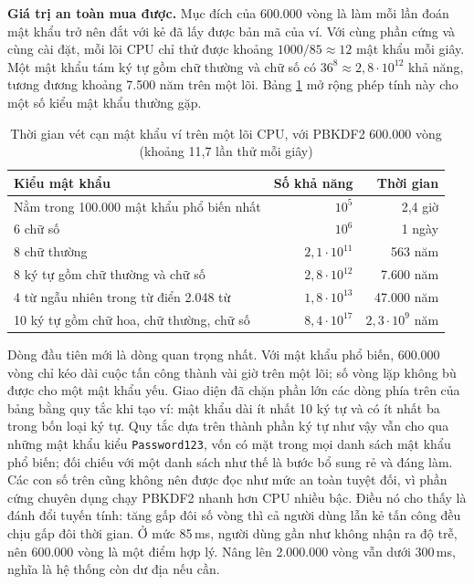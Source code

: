 \textbf{Giá trị an toàn mua được.} Mục đích của 600.000 vòng là làm mỗi lần đoán mật khẩu trở nên đắt với kẻ đã lấy được bản mã của ví. Với cùng phần cứng và cùng cài đặt, mỗi lõi CPU chỉ thử được khoảng $1000/85 \approx 12$ mật khẩu mỗi giây. Một mật khẩu tám ký tự gồm chữ thường và chữ số có $36^8 \approx 2{,}8 \cdot 10^{12}$ khả năng, tương đương khoảng 7.500 năm trên một lõi. Bảng \ref{tab:v2-password} mở rộng phép tính này cho một số kiểu mật khẩu thường gặp.

\begin{table}[H]
\centering
\caption{Thời gian vét cạn mật khẩu ví trên một lõi CPU, với PBKDF2 600.000 vòng (khoảng 11,7 lần thử mỗi giây)}
\label{tab:v2-password}
\renewcommand{\arraystretch}{1.2}
\small
\begin{tabular}{|p{6.2cm}|r|r|}
\hline
\textbf{Kiểu mật khẩu} & \textbf{Số khả năng} & \textbf{Thời gian} \\ \hline
Nằm trong 100.000 mật khẩu phổ biến nhất & $10^5$ & 2,4 giờ \\ \hline
6 chữ số & $10^6$ & 1 ngày \\ \hline
8 chữ thường & $2{,}1 \cdot 10^{11}$ & 563 năm \\ \hline
8 ký tự gồm chữ thường và chữ số & $2{,}8 \cdot 10^{12}$ & 7.600 năm \\ \hline
4 từ ngẫu nhiên trong từ điển 2.048 từ & $1{,}8 \cdot 10^{13}$ & 47.000 năm \\ \hline
10 ký tự gồm chữ hoa, chữ thường, chữ số & $8{,}4 \cdot 10^{17}$ & $2{,}3 \cdot 10^{9}$ năm \\ \hline
\end{tabular}
\end{table}

Dòng đầu tiên mới là dòng quan trọng nhất. Với mật khẩu phổ biến, 600.000 vòng chỉ kéo dài cuộc tấn công thành vài giờ trên một lõi; số vòng lặp không bù được cho một mật khẩu yếu. Giao diện đã chặn phần lớn các dòng phía trên của bảng bằng quy tắc khi tạo ví: mật khẩu dài ít nhất 10 ký tự và có ít nhất ba trong bốn loại ký tự. Quy tắc dựa trên thành phần ký tự như vậy vẫn cho qua những mật khẩu kiểu \texttt{Password123}, vốn có mặt trong mọi danh sách mật khẩu phổ biến; đối chiếu với một danh sách như thế là bước bổ sung rẻ và đáng làm. Các con số trên cũng không nên được đọc như mức an toàn tuyệt đối, vì phần cứng chuyên dụng chạy PBKDF2 nhanh hơn CPU nhiều bậc. Điều nó cho thấy là đánh đổi tuyến tính: tăng gấp đôi số vòng thì cả người dùng lẫn kẻ tấn công đều chịu gấp đôi thời gian. Ở mức 85\,ms, người dùng gần như không nhận ra độ trễ, nên 600.000 vòng là một điểm hợp lý. Nâng lên 2.000.000 vòng vẫn dưới 300\,ms, nghĩa là hệ thống còn dư địa nếu cần.

